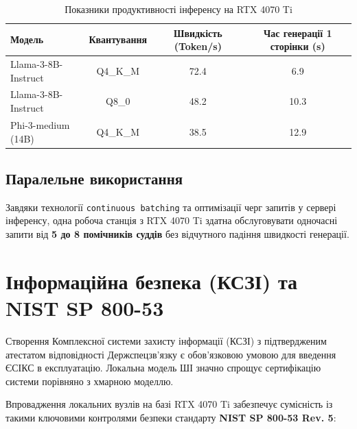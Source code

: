 \documentclass{article}
\begin{document}
\begin{table}[h]
\centering
\caption{Показники продуктивності інференсу на RTX 4070 Ti} \label{tab:performance}
\vspace{10pt}
\begin{tabular}{lccc}
\toprule
\textbf{Модель} & \textbf{Квантування} & \textbf{Швидкість (Token/s)} & \textbf{Час генерації 1 сторінки (s)} \\
\midrule
Llama-3-8B-Instruct & Q4\_K\_M & 72.4 & 6.9 \\
Llama-3-8B-Instruct & Q8\_0 & 48.2 & 10.3 \\
Phi-3-medium (14B) & Q4\_K\_M & 38.5 & 12.9 \\
\bottomrule
\end{tabular}
\end{table}

\subsection{Паралельне використання}
Завдяки технології \texttt{continuous batching} та оптимізації черг запитів у сервері інференсу, одна робоча станція з RTX 4070 Ti здатна обслуговувати одночасні запити від \textbf{5 до 8 помічників суддів} без відчутного падіння швидкості генерації.

\section{Інформаційна безпека (КСЗІ) та NIST SP 800-53}
Створення Комплексної системи захисту інформації (КСЗІ) з підтвердженим атестатом відповідності Держспецзв'язку є обов'язковою умовою для введення ЄСІКС в експлуатацію. Локальна модель ШІ значно спрощує сертифікацію системи порівняно з хмарною моделлю.

Впровадження локальних вузлів на базі RTX 4070 Ti забезпечує сумісність із такими ключовими контролями безпеки стандарту \textbf{NIST SP 800-53 Rev. 5}:
\end{document}
